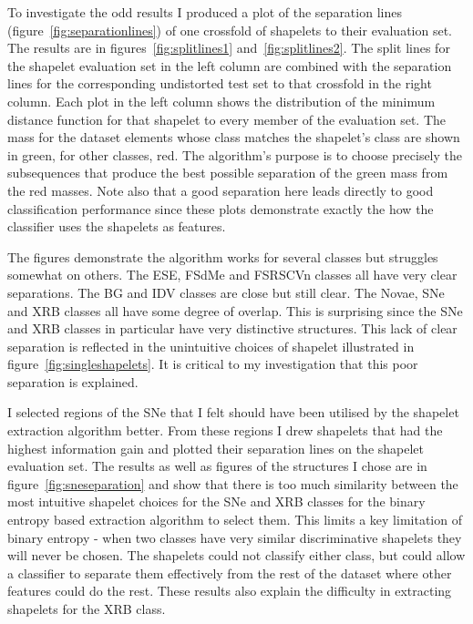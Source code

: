 To investigate the odd results I produced a plot of the separation lines (figure~\ref{fig:separationlines}) of one crossfold of shapelets to their evaluation set. The results are in figures~\ref{fig:splitlines1} and~\ref{fig:splitlines2}. The split lines for the shapelet evaluation set in the left column are combined with the separation lines for the corresponding undistorted test set to that crossfold in the right column. Each plot in the left column shows the distribution of the minimum distance function for that shapelet to every member of the evaluation set. The mass for the dataset elements whose class matches the shapelet's class are shown in green, for other classes, red. The algorithm's purpose is to choose precisely the subsequences that produce the best possible separation of the green mass from the red masses. Note also that a good separation here leads directly to good classification performance since these plots demonstrate exactly the how the classifier uses the shapelets as features.

The figures demonstrate the algorithm works for several classes but struggles somewhat on others. The ESE, FSdMe and FSRSCVn classes all have very clear separations. The BG and IDV classes are close but still clear. The Novae, SNe and XRB classes all have some degree of overlap. This is surprising since the SNe and XRB classes in particular have very distinctive structures. This lack of clear separation is reflected in the unintuitive choices of shapelet illustrated in figure~\ref{fig:singleshapelets}. It is critical to my investigation that this poor separation is explained.

I selected regions of the SNe that I felt should have been utilised by the shapelet extraction algorithm better. From these regions I drew shapelets that had the highest information gain and plotted their separation lines on the shapelet evaluation set. The results as well as figures of the structures I chose are in figure~\ref{fig:sneseparation} and show that there is too much similarity between the most intuitive shapelet choices for the SNe and XRB classes for the binary entropy based extraction algorithm to select them. This limits a key limitation of binary entropy - when two classes have very similar discriminative shapelets they will never be chosen. The shapelets could not classify either class, but could allow a classifier to separate them effectively from the rest of the dataset where other features could do the rest. These results also explain the difficulty in extracting shapelets for the XRB class.

